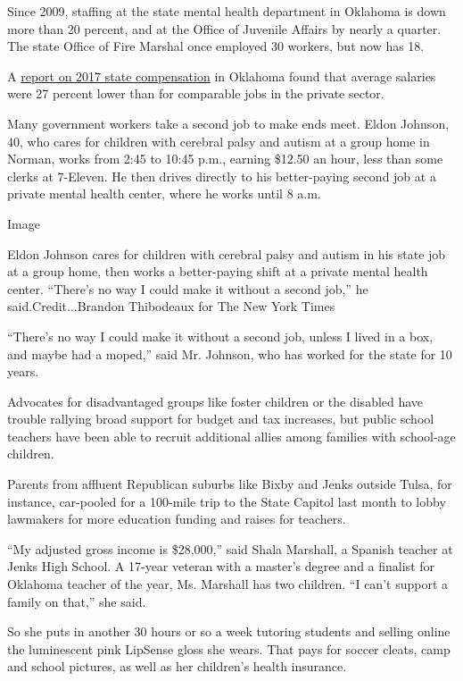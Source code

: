 Since 2009, staffing at the state mental health department in Oklahoma
is down more than 20 percent, and at the Office of Juvenile Affairs by
nearly a quarter. The state Office of Fire Marshal once employed 30
workers, but now has 18.

A
\href{https://www.ok.gov/opm/documents/2017AnnualCompensationReport.pdf}{report
on 2017 state compensation} in Oklahoma found that average salaries were
27 percent lower than for comparable jobs in the private sector.

Many government workers take a second job to make ends meet. Eldon
Johnson, 40, who cares for children with cerebral palsy and autism at a
group home in Norman, works from 2:45 to 10:45 p.m., earning \$12.50 an
hour, less than some clerks at 7-Eleven. He then drives directly to his
better-paying second job at a private mental health center, where he
works until 8 a.m.

Image

Eldon Johnson cares for children with cerebral palsy and autism in his
state job at a group home, then works a better-paying shift at a private
mental health center. ``There's no way I could make it without a second
job,'' he said.Credit...Brandon Thibodeaux for The New York Times

``There's no way I could make it without a second job, unless I lived in
a box, and maybe had a moped,'' said Mr. Johnson, who has worked for the
state for 10 years.

Advocates for disadvantaged groups like foster children or the disabled
have trouble rallying broad support for budget and tax increases, but
public school teachers have been able to recruit additional allies among
families with school-age children.

Parents from affluent Republican suburbs like Bixby and Jenks outside
Tulsa, for instance, car-pooled for a 100-mile trip to the State Capitol
last month to lobby lawmakers for more education funding and raises for
teachers.

``My adjusted gross income is \$28,000,'' said Shala Marshall, a Spanish
teacher at Jenks High School. A 17-year veteran with a master's degree
and a finalist for Oklahoma teacher of the year, Ms. Marshall has two
children. ``I can't support a family on that,'' she said.

So she puts in another 30 hours or so a week tutoring students and
selling online the luminescent pink LipSense gloss she wears. That pays
for soccer cleats, camp and school pictures, as well as her children's
health insurance.

